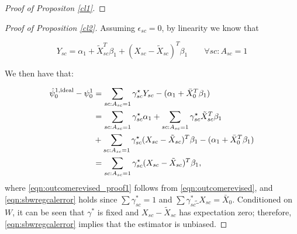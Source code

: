 \begin{proof}[Proof of Propositon \ref{cl1}]


\end{proof}


\begin{proof}[Proof of Proposition \ref{cl2}]
Assuming $\epsilon_{sc} = 0$, by linearity we know that

\begin{equation}\label{eqn:outcomerevised}
Y_{sc} = \alpha_1 + \tilde{X}_{sc}^T\beta_1 + (X_{sc} - \tilde{X}_{sc})^T\beta_1 \qquad \forall sc: A_{sc} = 1
\end{equation}

We then have that:

\begin{align}\nonumber
    \hat{\psi}_0^{1,\textup{ideal}} - \psi_0^1 &= \sum_{sc: A_{sc} = 1}\gamma_{sc}^\star Y_{sc} - (\alpha_1 + \bar{X}_0^T\beta_1) \\
    \nonumber &= \sum_{sc: A_{sc} = 1}\gamma_{sc}^\star\alpha_1 + \sum_{sc: A_{sc} = 1}\gamma_{sc}^\star\tilde{X}_{sc}^T\beta_1 \\ 
    &+ \sum_{sc: A_{sc} = 1}\gamma_{sc}^\star(X_{sc} - \tilde{X}_{sc})^T\beta_1 - (\alpha_1 + \bar{X}_0^T\beta_1) \label{eqn:outcomerevised_proof1}\\
    &= \sum_{sc: A_{sc} = 1}\gamma_{sc}^\star(X_{sc} - \tilde{X}_{sc})^T\beta_1\label{eqn:sbwregcalerror},
\end{align}
where \eqref{eqn:outcomerevised_proof1} follows from \eqref{eqn:outcomerevised}, and \eqref{eqn:sbwregcalerror} holds since $\sum \gamma_{sc}^* = 1$ and $\sum \gamma_{sc}^* \tilde_{X}_{sc} = \bar{X}_0$. Conditioned on $W$, it can be seen that $\gamma^*$ is fixed and $X_{sc} - \tilde{X}_{sc}$ has expectation zero; therefore, \eqref{eqn:sbwregcalerror} implies that the estimator is unbiased.
\end{proof}


